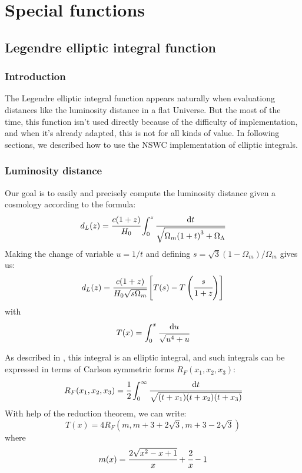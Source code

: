 \chapter{Special functions}
%
\section{Legendre elliptic integral function}
%
\subsection{Introduction}
%
The Legendre elliptic integral function appears naturally when evaluationg
distances like the luminosity distance in a flat Universe. But the most of the
time, this function isn't used directly because of the difficulty of
implementation, and when it's already adapted, this is not for all kinds of
value. In following sections, we described how to use the NSWC implementation
of elliptic integrals.
%
\subsection{Luminosity distance}
%
Our goal is to easily and precisely compute the luminosity distance given a
cosmology according to the formula:
%
\begin{equation}
    d_L(z)=\cfrac{c(1+z)}{H_0}\int_0^z\cfrac{{\rm{d}}{t}}{\sqrt{\Omega_m{(1+t)}^3+\Omega_\Lambda}}
\end{equation}
%
Making the change of variable $u=1/t$ and defining
$s=\sqrt{3}{(1-\Omega_m)/\Omega_m}$ gives us:
%
\begin{equation}
    d_L(z)=\cfrac{c(1+z)}{H_0\sqrt{s\Omega_m}}\left[T(s)-T\left(\cfrac{s}{1+z}\right)\right]
\end{equation}
%
with
%
\begin{equation}
    T(x)=\int_0^x\cfrac{{\rm{d}}{u}}{\sqrt{u^4+u}}
\end{equation}

As described in \citet{Liu+11}, this integral is an elliptic integral, and such
integrals can be expressed in terms of Carlson symmetric forms
$R_F(x_1,x_2,x_3)$:
%
\begin{equation}
    R_F(x_1,x_2,x_3)=\cfrac{1}{2}\int_0^\infty\cfrac{{\rm{d}}{t}}{\sqrt{(t+x_1)(t+x_2)(t+x_3)}}
\end{equation}
%
With help of the reduction theorem, we can write: 
%
\begin{equation}
    T(x)=4R_F(m,m+3+2\sqrt{3},m+3-2\sqrt{3})
\end{equation}
%
where
%
\begin{equation}
    m(x)=\cfrac{2\sqrt{x^2-x+1}}{x}+\cfrac{2}{x}-1
\end{equation}
%

